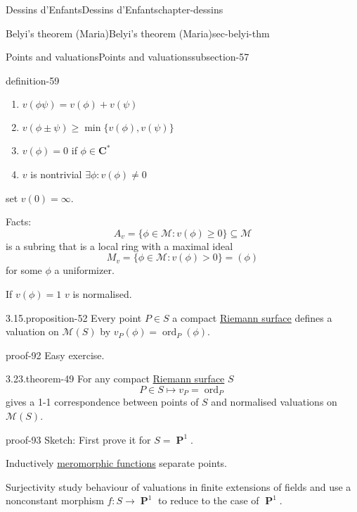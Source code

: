 \documentclass[oneside,10pt,]{book}
\numberwithin{equation}{section}
\newcommand{\CC}{\mathbf{C}}
\DeclareMathOperator{\ord}{ord}
\DeclareMathOperator{\PP}{\mathbf{P}}
\newcommand{\gt}{>}
\begin{document}
\begin{chapterptx}{Dessins d'Enfants}{}{Dessins d'Enfants}{}{}{chapter-dessins}
\begin{sectionptx}{Belyi's theorem (Maria)}{}{Belyi's theorem (Maria)}{}{}{sec-belyi-thm}
\begin{subsectionptx}{Points and valuations}{}{Points and valuations}{}{}{subsection-57}
\begin{definition}{}{definition-59}
\begin{enumerate}
\item\hypertarget{li-121}{}\(v(\phi\psi) = v(\phi)  + v(\psi)\)%
\item\hypertarget{li-122}{}\(v(\phi\pm\psi) \ge \min\{ v(\phi)  , v(\psi)\}\)%
\item\hypertarget{li-123}{}\(v(\phi) = 0 \) if \(\phi \in \CC^*\)%
\item\hypertarget{li-124}{}\(v\) is nontrivial \(\exists \phi : v(\phi)\ne 0\)%
\end{enumerate}
set \(v(0) = \infty\).%
\end{definition}
\hypertarget{p-616}{}%
Facts:%
\begin{equation*}
A_v = \{\phi \in \mathcal M : v(\phi) \ge 0 \} \subseteq \mathcal M
\end{equation*}
is a subring that is a local ring with a maximal ideal%
\begin{equation*}
M_v = \{ \phi\in \mathcal M : v(\phi) \gt 0\} = (\phi)
\end{equation*}
for some \(\phi\) a uniformizer.%
\par
\hypertarget{p-617}{}%
If \(v(\phi) = 1\) \(v\) is normalised.%
\begin{proposition}{3.15.}{}{proposition-52}%
\hypertarget{p-618}{}%
Every point \(P \in S\) a compact \hyperref[def-top-riem-surface]{Riemann surface} defines a valuation on \(\mathcal M(S)\) by \(v_P(\phi) = \ord_P(\phi)\).%
\end{proposition}
\begin{proofptx}{}{proof-92}
\hypertarget{p-619}{}%
Easy exercise.%
\end{proofptx}
\begin{theorem}{3.23.}{}{theorem-49}%
\hypertarget{p-620}{}%
For any compact \hyperref[def-top-riem-surface]{Riemann surface} \(S\)%
\begin{equation*}
P\in S \mapsto v_P = \ord_P
\end{equation*}
gives a 1-1 correspondence between points of \(S\) and normalised valuations on \(\mathcal M(S)\).%
\end{theorem}
\begin{proofptx}{}{proof-93}
\hypertarget{p-621}{}%
Sketch: First prove it for \(S = \PP^1\).%
\par
\hypertarget{p-622}{}%
Inductively \hyperref[def-morph-riem-surf]{meromorphic functions} separate points.%
\par
\hypertarget{p-623}{}%
Surjectivity study behaviour of valuations in finite extensions of fields and use a nonconstant morphism \(f\colon S \to \PP^1\) to reduce to the case of \(\PP^1\).%

\end{proofptx}
\end{subsectionptx}
\end{sectionptx}
\end{chapterptx}
\end{document}
